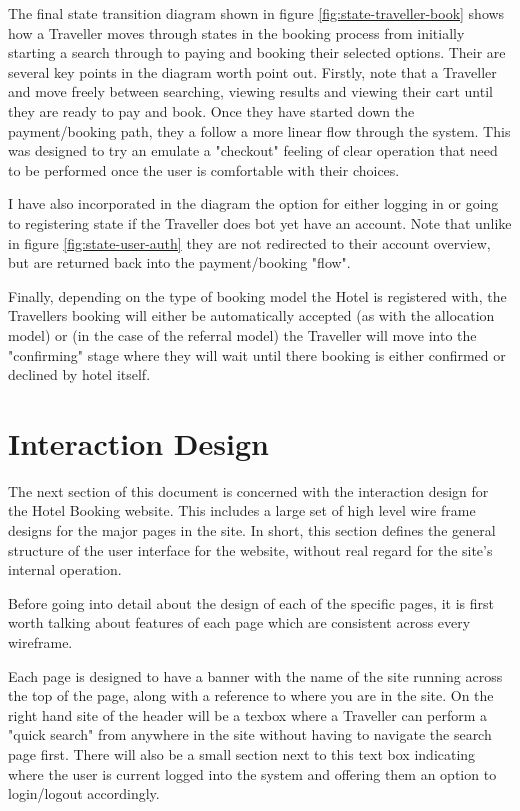 \documentclass{article}
\begin{document}
The final state transition diagram shown in figure \ref{fig:state-traveller-book} shows how a Traveller moves through states in the booking process from initially starting a search through to paying and booking their selected options. Their are several key points in the diagram worth point out. Firstly, note that a Traveller and move freely between searching, viewing results and viewing their cart until they are ready to pay and book. Once they have started down the payment/booking path, they a follow a more linear flow through the system. This was designed to try an emulate a "checkout" feeling of clear operation that need to be performed once the user is comfortable with their choices.

I have also incorporated in the diagram the option for either logging in or going to registering state if the Traveller does bot yet have an account. Note that unlike in figure \ref{fig:state-user-auth} they are not redirected to their account overview, but are returned back into the payment/booking "flow".

Finally, depending on the type of booking model the Hotel is registered with, the Travellers booking will either be automatically accepted (as with the allocation model) or  (in the case of the referral model) the Traveller will move into the "confirming" stage where they will wait until there booking is either confirmed or declined by hotel itself.

\section{Interaction Design}
The next section of this document is concerned with the interaction design for the  Hotel Booking website. This includes a large set of high level wire frame designs for the major pages in the site. In short, this section defines the general structure of the user interface for the website, without real regard for the site's internal operation.

Before going into detail about the design of each of the specific pages, it is first worth talking about features of each page which are consistent across every wireframe. 

Each page is designed to have a banner with the name of the site running across the top of the page, along with a reference to where you are in the site. On the right hand site of the header will be a texbox where a Traveller can perform a "quick search" from anywhere in the site without having to navigate the search page first. There will also be a small section next to this text box indicating where the user is current logged into the system and offering them an option to login/logout accordingly.
\end{document}
